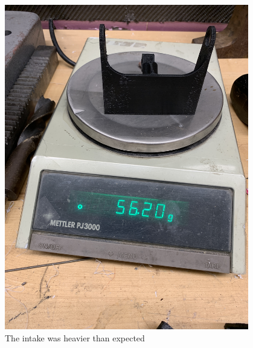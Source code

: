\begin{figure}[htp]
\centering
\includegraphics[width=0.95\textwidth, angle=0]{Meetings/December/12-28-21/12-28-21_Hardware_Figure1 - Nathan Forrer.JPG}
\caption{The intake was heavier than expected}
\label{fig:122821_1}
\end{figure}



